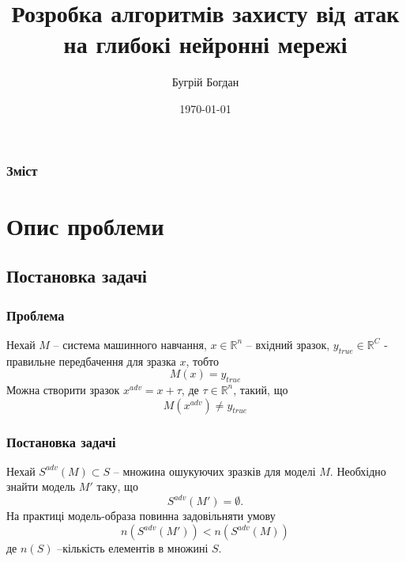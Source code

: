 \documentclass{beamer}
\title[Short title]{Розробка алгоритмів захисту від атак на глибокі нейронні мережі} %
\author{Бугрій Богдан} %
\institute[UCLA] %
{
	Львівський національний університет імені Івана Франка \\
	Факультет прикладної математики та інформатики 
}
\date{\today} %
\numberwithin{equation}{section}
\begin{document}
	
	\begin{frame}
		\titlepage
	\end{frame}
	
	
	\begin{frame}
		\frametitle{Зміст}
		\tableofcontents
	\end{frame}

	\section{Опис проблеми}
	
	\subsection{Постановка задачі}

	\begin{frame}
		\frametitle{Проблема}
		Нехай $M$ -- система машинного навчання, $x\in \mathbb{R}^n$ -- вхідний зразок, $y_{true}\in \mathbb{R}^C$ - правильне передбачення для зразка $x$, тобто 
		\begin{equation}
			M(x) = y_{true}
		\end{equation} 
		Можна створити зразок $x^{adv}=x+\tau$, де $\tau\in \mathbb{R}^n$, такий, що 
		\begin{equation}
			M(x^{adv})\neq y_{true}
		\end{equation}
	\end{frame}

	\begin{frame}
		\frametitle{Постановка задачі}
		Нехай $S^{adv}(M) \subset S$ -- множина ошукуючих зразків для моделі $M$. Необхідно знайти модель $M'$ таку, що
		\begin{equation}
			S^{adv}(M') = \emptyset.
		\end{equation}
		На практиці модель-образа повинна задовільняти умову
		\begin{equation}
			n(S^{adv}(M')) < n(S^{adv}(M))
		\end{equation}
		де $n(S)$ --кількість елементів в множині $S$.
	\end{frame}
\end{document}
